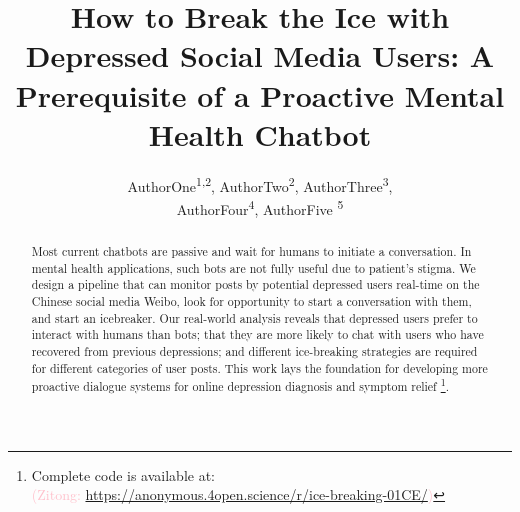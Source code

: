 \documentclass[letterpaper]{article}
\title{How to Break the Ice with Depressed Social Media Users: A Prerequisite of a Proactive Mental Health Chatbot}
\author{
       AuthorOne\equalcontrib\textsuperscript{\rm 1,\rm 2},
       AuthorTwo\equalcontrib\textsuperscript{\rm 2},
       AuthorThree\textsuperscript{\rm 3},\\
       AuthorFour\textsuperscript{\rm 4},
       AuthorFive \textsuperscript{\rm 5}}
\newcommand{\ZT}[1]{\textcolor{pink}{(Zitong: #1)}}
\begin{document}
\maketitle
\begin{abstract}
Most current chatbots are passive and wait for humans to initiate a conversation.
In mental health applications, such bots are not fully useful due to patient's stigma. 
We design a pipeline that can monitor posts by potential depressed users real-time on the Chinese social media Weibo, 
look for opportunity to start a conversation with them, and start an icebreaker.
Our real-world analysis reveals that depressed users prefer to interact with humans than bots; 
that they are more likely to chat with users who have recovered from previous depressions; 
and different ice-breaking strategies are required for different categories of user posts.
This work lays the foundation for developing more proactive dialogue
systems for online depression diagnosis and symptom relief \footnote{Complete code is available at: \\ \ZT{\url{https://anonymous.4open.science/r/ice-breaking-01CE/}}}. 
\end{abstract}











%


\appendix

\end{document}
